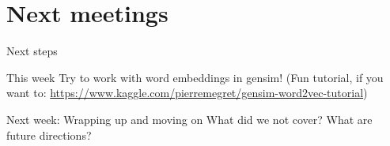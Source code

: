 \documentclass{beamer}
\begin{document}
\section{Next meetings}
\begin{frame}{Next steps}

\begin{block}{This week}
Try to work with word embeddings in gensim!
(Fun tutorial, if you want to: \url{https://www.kaggle.com/pierremegret/gensim-word2vec-tutorial})
\end{block}

\begin{block}{Next week: Wrapping up and moving on}
What did we not cover? What are future directions?
\end{block}


\end{frame}
\end{document}
